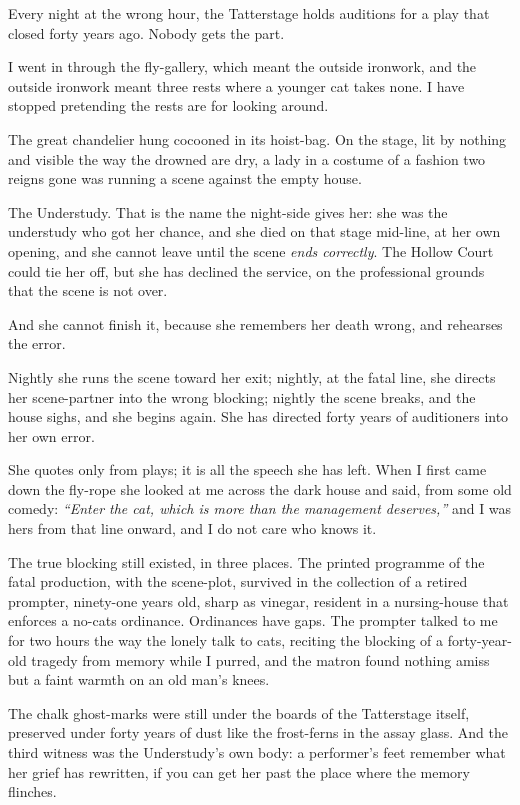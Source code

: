 Every night at the wrong hour, the Tatterstage holds auditions for a play that closed forty years ago. Nobody gets the part.

I went in through the fly-gallery, which meant the outside ironwork, and the outside ironwork meant three rests where a younger cat takes none. I have stopped pretending the rests are for looking around.

The great chandelier hung cocooned in its hoist-bag. On the stage, lit by nothing and visible the way the drowned are dry, a lady in a costume of a fashion two reigns gone was running a scene against the empty house.

The Understudy. That is the name the night-side gives her: she was the understudy who got her chance, and she died on that stage mid-line, at her own opening, and she cannot leave until the scene \emph{ends correctly}. The Hollow Court could tie her off, but she has declined the service, on the professional grounds that the scene is not over.

And she cannot finish it, because she remembers her death wrong, and rehearses the error.

Nightly she runs the scene toward her exit; nightly, at the fatal line, she directs her scene-partner into the wrong blocking; nightly the scene breaks, and the house sighs, and she begins again. She has directed forty years of auditioners into her own error.

She quotes only from plays; it is all the speech she has left. When I first came down the fly-rope she looked at me across the dark house and said, from some old comedy: \emph{``Enter the cat, which is more than the management deserves,''} and I was hers from that line onward, and I do not care who knows it.

The true blocking still existed, in three places. The printed programme of the fatal production, with the scene-plot, survived in the collection of a retired prompter, ninety-one years old, sharp as vinegar, resident in a nursing-house that enforces a no-cats ordinance. Ordinances have gaps. The prompter talked to me for two hours the way the lonely talk to cats, reciting the blocking of a forty-year-old tragedy from memory while I purred, and the matron found nothing amiss but a faint warmth on an old man's knees.

The chalk ghost-marks were still under the boards of the Tatterstage itself, preserved under forty years of dust like the frost-ferns in the assay glass. And the third witness was the Understudy's own body: a performer's feet remember what her grief has rewritten, if you can get her past the place where the memory flinches.

